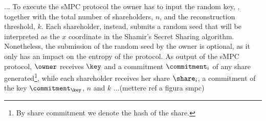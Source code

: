 ...
\newline
To execute the sMPC protocol the owner has to input the random key, \key, together with the total number of shareholders, $n$, and the reconstruction threshold, $k$. Each shareholder, instead, submits a random seed that will be interpreted as the $x$ coordinate in the Shamir's Secret Sharing algorithm. 
Nonetheless, the submission of the random seed by the owner is optional, as it only has an impact on the entropy of the protocol. 
As output of the sMPC protocol, $\owner$ receives $\key$ and a commitment $\commitment _i$ of any share generated\footnote{By share commitment we denote the hash of the share.}, while each shareholder receives her share $\share_{i}$, a commitment of the key $ \commitment _ \key $, $n$ and $k$ 
...(mettere ref a figura smpc)